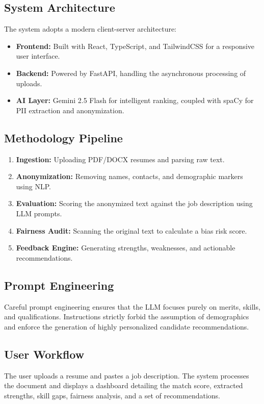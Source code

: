 \documentclass[12pt,a4paper]{article}
\begin{document}
\subsection{System Architecture}
The system adopts a modern client-server architecture:
\begin{itemize}
    \item \textbf{Frontend:} Built with React, TypeScript, and TailwindCSS for a responsive user interface.
    \item \textbf{Backend:} Powered by FastAPI, handling the asynchronous processing of uploads.
    \item \textbf{AI Layer:} Gemini 2.5 Flash for intelligent ranking, coupled with spaCy for PII extraction and anonymization.
\end{itemize}

\subsection{Methodology Pipeline}
\begin{enumerate}
    \item \textbf{Ingestion:} Uploading PDF/DOCX resumes and parsing raw text.
    \item \textbf{Anonymization:} Removing names, contacts, and demographic markers using NLP.
    \item \textbf{Evaluation:} Scoring the anonymized text against the job description using LLM prompts.
    \item \textbf{Fairness Audit:} Scanning the original text to calculate a bias risk score.
    \item \textbf{Feedback Engine:} Generating strengths, weaknesses, and actionable recommendations.
\end{enumerate}

\subsection{Prompt Engineering}
Careful prompt engineering ensures that the LLM focuses purely on merits, skills, and qualifications. Instructions strictly forbid the assumption of demographics and enforce the generation of highly personalized candidate recommendations.

\subsection{User Workflow}
The user uploads a resume and pastes a job description. The system processes the document and displays a dashboard detailing the match score, extracted strengths, skill gaps, fairness analysis, and a set of recommendations. 
\end{document}
